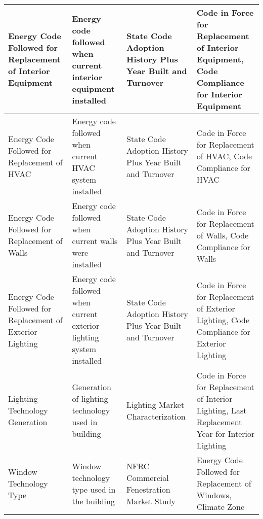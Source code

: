 \begin{center}
\begin{longtable}{|p{1.3in}|p{1.5in}|p{1.5in}|p{1.5in}|}
Energy Code Followed for Replacement of Interior Equipment      & Energy code followed when current interior equipment installed                 & State Code Adoption History Plus Year Built and Turnover    & Code in Force for Replacement of Interior Equipment, Code Compliance for Interior Equipment          \\ \hline
Energy Code Followed for Replacement of HVAC                    & Energy code followed when current HVAC system installed                        & State Code Adoption History Plus Year Built and Turnover    & Code in Force for Replacement of HVAC, Code Compliance for HVAC                                      \\ \hline
Energy Code Followed for Replacement of Walls                   & Energy code followed when current walls were installed                         & State Code Adoption History Plus Year Built and Turnover    & Code in Force for Replacement of Walls, Code Compliance for Walls                                    \\ \hline
Energy Code Followed for Replacement of Exterior Lighting       & Energy code followed when current exterior lighting system installed           & State Code Adoption History Plus Year Built and Turnover    & Code in Force for Replacement of Exterior Lighting, Code Compliance for Exterior Lighting            \\ \hline
Lighting Technology Generation                                  & Generation of lighting technology used in building                             & Lighting Market Characterization                            & Code in Force for Replacement of Interior Lighting, Last Replacement Year for Interior Lighting      \\ \hline
Window Technology Type                                          & Window technology type used in the building                                    & NFRC Commercial Fenestration Market Study                   & Energy Code Followed for Replacement of Windows, Climate Zone                                        \\ \hline
\end{longtable}
\end{center}